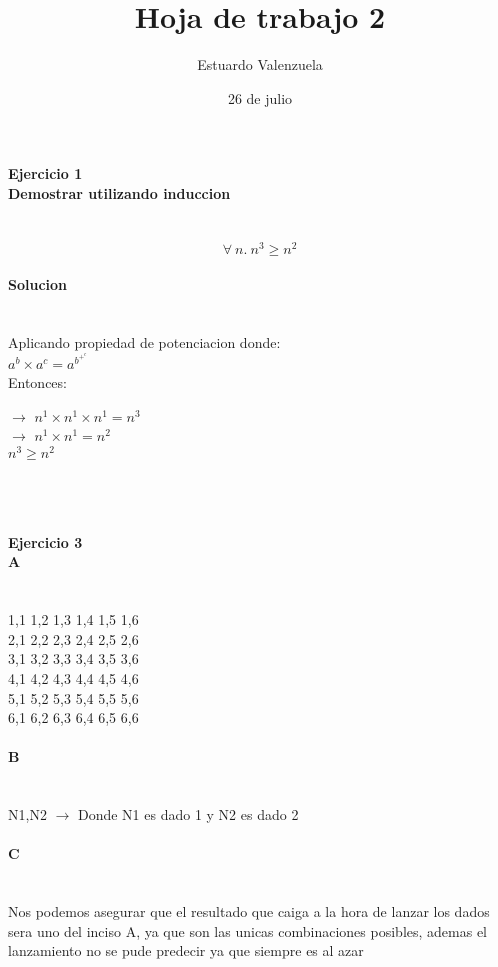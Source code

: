 \documentclass{article}
\begin{document}
\title{Hoja de trabajo 2}
\author{Estuardo Valenzuela}
\date{26 de julio}
\maketitle
\paragraph{Ejercicio 1 \ \\ Demostrar utilizando induccion}
\ \\ \[
\forall\ n.\ n^3\geq n^2
 \]
\paragraph{Solucion}
\ \\ 
Aplicando propiedad de potenciacion donde:
\ \\ $a^b×a^c=a^b^+^c$
\ \\
Entonces:
\begin{center}
$\rightarrow$ $n^1×n^1×n^1 = n^3$
\ \\ $\rightarrow$ $n^1×n^1 = n^2$
\ \\ $n^3\geq n^2$
\end{center} 
\ \\
\ \\ \paragraph{Ejercicio 3 \ \\ A}
\ \\ 1,1 1,2 1,3 1,4 1,5 1,6
\ \\ 2,1 2,2 2,3 2,4 2,5 2,6
\ \\ 3,1 3,2 3,3 3,4 3,5 3,6
\ \\ 4,1 4,2 4,3 4,4 4,5 4,6
\ \\ 5,1 5,2 5,3 5,4 5,5 5,6
\ \\ 6,1 6,2 6,3 6,4 6,5 6,6
\ \\ \paragraph{B}
\ \\ N1,N2 $\rightarrow$  Donde N1 es dado 1 y N2 es dado 2
\ \\ \paragraph{C}
\ \\ Nos podemos asegurar que el resultado que caiga a la hora de lanzar los dados sera uno del inciso A, ya que son las unicas combinaciones posibles, ademas el lanzamiento no se pude predecir ya que siempre es al azar 
\end{document}
